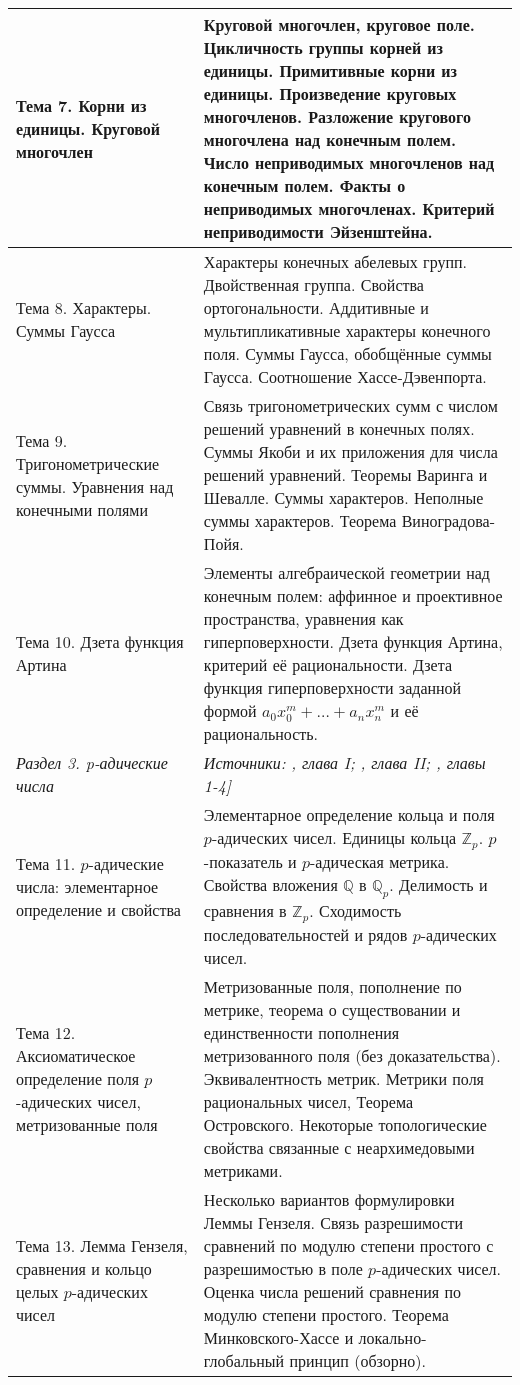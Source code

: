 \documentclass[a4paper, 12pt]{article}
\begin{document}
\begin{longtable}{ | >{\raggedright}p{6cm} | p{9cm} | }
    Тема 7. Корни из единицы. Круговой многочлен & Круговой многочлен, круговое поле. Цикличность группы корней из единицы. Примитивные корни из единицы. Произведение круговых многочленов. Разложение кругового многочлена над конечным полем. Число неприводимых многочленов над конечным полем. Факты о неприводимых многочленах. Критерий неприводимости Эйзенштейна. \\ \hline
    Тема 8. Характеры. Суммы Гаусса & Характеры конечных абелевых групп. Двойственная группа. Свойства ортогональности. Аддитивные и мультипликативные характеры конечного поля. Суммы Гаусса, обобщённые суммы Гаусса. Соотношение Хассе-Дэвенпорта. \\ \hline
    Тема 9. Тригонометрические суммы. Уравнения над конечными полями & Связь тригонометрических сумм с числом решений уравнений в конечных полях. Суммы Якоби и их приложения для числа решений уравнений. Теоремы Варинга и Шевалле. Суммы характеров. Неполные суммы характеров. Теорема Виноградова-Пойя. \\ \hline
    Тема 10. Дзета функция Артина & Элементы алгебраической геометрии над конечным полем: аффинное и проективное пространства, уравнения как гиперповерхности. Дзета функция Артина, критерий её рациональности.  Дзета функция гиперповерхности заданной формой $a_0 x_0^m + \dots + a_n x_n^m$ и её рациональность. \\ \hline
    \textit{Раздел 3. p-адические числа} & \textit{Источники: \cite{BSh}, глава I; \cite{Serre}, глава II; \cite{Gouv}, главы 1-4]} \\ \hline
    Тема 11. $p$-адические числа: элементарное определение и свойства & Элементарное определение кольца и поля $p$-адических чисел. Единицы кольца $\mathbb{Z}_p$. $p$-показатель и $p$-адическая метрика. Свойства вложения $\mathbb{Q}$ в $\mathbb{Q}_p$. Делимость и сравнения в $\mathbb{Z}_p$. Сходимость последовательностей и рядов $p$-адических чисел. \\ \hline
    Тема 12. Аксиоматическое определение поля $p$-адических чисел, метризованные поля & Метризованные поля, пополнение по метрике, теорема о существовании и единственности пополнения метризованного поля (без доказательства). Эквивалентность метрик. Метрики поля рациональных чисел, Теорема Островского. Некоторые топологические свойства связанные с неархимедовыми метриками.  \\ \hline
    Тема 13. Лемма Гензеля, сравнения и кольцо целых $p$-адических чисел & Несколько вариантов формулировки Леммы Гензеля. Связь разрешимости сравнений по модулю степени простого с разрешимостью в поле $p$-адических чисел. Оценка числа решений сравнения по модулю степени простого. Теорема Минковского-Хассе и локально-глобальный принцип (обзорно). \\ \hline

\end{longtable}
\end{document}

